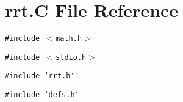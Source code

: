 \section{rrt.C File Reference}
\label{rrt_C}
{\tt \#include $<$math.h$>$}\par
{\tt \#include $<$stdio.h$>$}\par
{\tt \#include \char`\"{}rrt.h\char`\"{}}\par
{\tt \#include \char`\"{}defs.h\char`\"{}}\par

